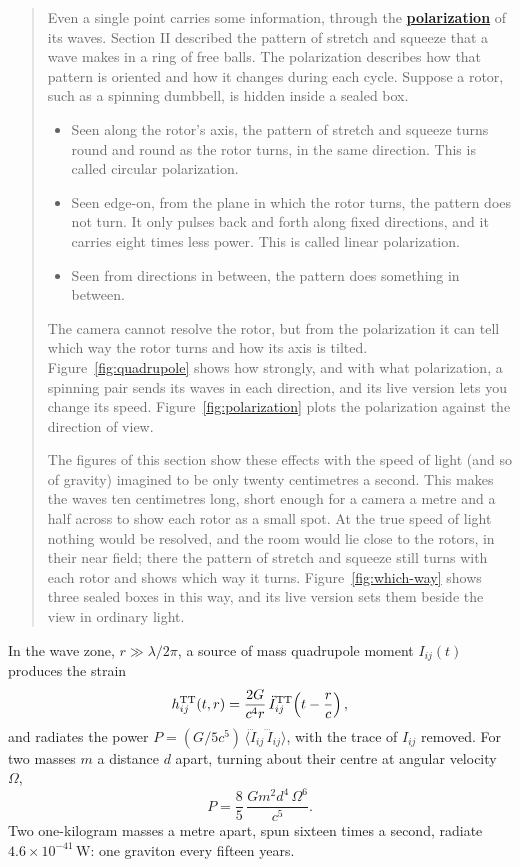 \begin{quote}
Even a single point carries some information, through the
\textbf{\href{https://en.wikipedia.org/wiki/Polarization_(waves)}{polarization}}
of its waves. Section II described the pattern of stretch and squeeze that a
wave makes in a ring of free balls. The polarization describes how that pattern
is oriented and how it changes during each cycle. Suppose a rotor, such as a
spinning dumbbell, is hidden inside a sealed box.
\begin{itemize}
\item Seen along the rotor's axis, the pattern of stretch and squeeze turns
round and round as the rotor turns, in the same direction. This is called
circular polarization.
\item Seen edge-on, from the plane in which the rotor turns, the pattern does
not turn. It only pulses back and forth along fixed directions, and it carries
eight times less power. This is called linear polarization.
\item Seen from directions in between, the pattern does something in between.
\end{itemize}
The camera cannot resolve the rotor, but from the polarization it can tell
which way the rotor turns and how its axis is tilted. Figure~\ref{fig:quadrupole} shows how strongly, and with what polarization, a spinning pair sends its waves in each direction, and its live version lets you change its speed. Figure~\ref{fig:polarization} plots the polarization against the direction of view.

The figures of this section show these effects with the speed of light (and so
of gravity) imagined to be only twenty centimetres a second. This makes the
waves ten centimetres long, short enough for a camera a metre and a half across
to show each rotor as a small spot. At the true speed of light nothing would be
resolved, and the room would lie close to the rotors, in their near field; there
the pattern of stretch and squeeze still turns with each rotor and shows which
way it turns. Figure~\ref{fig:which-way} shows three sealed boxes in this way, and its live version sets them beside the view in ordinary light.
\end{quote}

In the wave zone, $r \gg \lambda/2\pi$, a source of mass quadrupole moment
$I_{ij}(t)$ produces the strain
\begin{equation}\label{eq:quadrupole}
h_{ij}^{\mathrm{TT}}(t, r) = \frac{2G}{c^{4} r}\,
\ddot I_{ij}^{\mathrm{TT}}\!\left(t - \frac{r}{c}\right),
\end{equation}
and radiates the power $P = (G/5c^{5})\,\langle \dddot I_{ij}\,\dddot I_{ij}
\rangle$, with the trace of $I_{ij}$ removed. For two masses $m$ a distance $d$ apart, turning about their centre
at angular velocity $\Omega$,
\begin{equation}\label{eq:dumbbell}
P = \frac{8}{5}\,\frac{G m^{2} d^{4}\,\Omega^{6}}{c^{5}} .
\end{equation}
Two one-kilogram masses a metre apart, spun sixteen times a second, radiate
$4.6\times10^{-41}\,\mathrm{W}$: one graviton every fifteen years.

